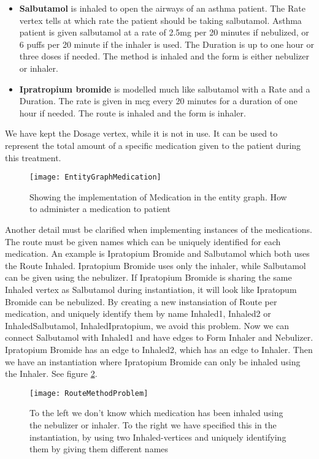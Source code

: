 \begin{itemize}
	\item \textbf{Salbutamol} is inhaled to open the airways of an asthma patient. The Rate vertex tells at which rate the patient should be taking salbutamol. Asthma patient is given salbutamol at a rate of 2.5mg per 20 minutes if nebulized, or 6 puffs per 20 minute if the inhaler is used. The Duration is up to one hour or three doses if needed. The method is inhaled and the form is either nebulizer or inhaler.
	
	\item \textbf{Ipratropium bromide} is modelled much like salbutamol with a Rate and a Duration. The rate is given in mcg every 20 minutes for a duration of one hour if needed. The route is inhaled and the form is inhaler.
\end{itemize}

 We have kept the Dosage vertex, while it is not in use. It can be used to represent the total amount of a specific medication given to the patient during this treatment.
 

\begin{figure}[h!]
	\caption {Showing the implementation of Medication in the entity graph. How to administer a medication to patient}
	\label{fig:EntityGraphMedication}
	\texttt{[image: EntityGraphMedication]}
\end{figure}

 Another detail must be clarified when implementing instances of the medications. The route must be given names which can be uniquely identified for each medication. An example is Ipratopium Bromide and Salbutamol which both uses the Route Inhaled. Ipratopium Bromide uses only the inhaler, while Salbutamol can be given using the nebulizer. If Ipratopium Bromide is sharing the same Inhaled vertex as Salbutamol during instantiation, it will look like Ipratopum Bromide can be nebulized. By creating a new instansiation of Route per medication, and uniquely identify them by name Inhaled1, Inhaled2 or InhaledSalbutamol, InhaledIpratopium, we avoid this problem. Now we can connect Salbutamol with Inhaled1 and have edges to Form Inhaler and Nebulizer. Ipratopium Bromide has an edge to Inhaled2, which has an edge to Inhaler. Then we have an instantiation where Ipratopium Bromide can only be inhaled using the Inhaler. See figure \ref{fig:RouteMethodProblem}.


\begin{figure}[h!]
	\caption {To the left we don't know which medication has been inhaled using the nebulizer or inhaler. To the right we have specified this in the instantiation, by using two Inhaled-vertices and uniquely identifying them by giving them different names}
	\label{fig:RouteMethodProblem}
	\texttt{[image: RouteMethodProblem]}
\end{figure}


